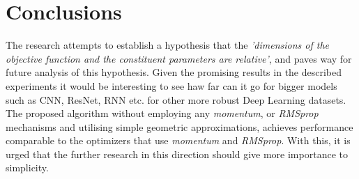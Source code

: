 \documentclass{article}
\begin{document}
\section{Conclusions}
The research attempts to establish a hypothesis that the \textit{'dimensions of the objective function and the constituent parameters are relative'}, and paves way for future analysis of this hypothesis. Given the promising results in the described experiments it would be interesting to see haw far can it go for bigger models such as CNN, ResNet, RNN etc. for other more robust Deep Learning datasets. The proposed algorithm without employing any \textit{momentum}, or \textit{RMSprop} mechanisms and utilising simple geometric approximations, achieves performance  comparable to the optimizers that use \textit{momentum }and \textit{RMSprop}. With this, it is urged that the further research in this direction should give more importance to simplicity.



\end{document}

